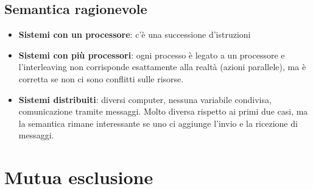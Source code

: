 \documentclass[12pt, a4paper]{report}
\begin{document}
                \subsection{Semantica ragionevole}
                    \begin{itemize}
                        \item \textbf{Sistemi con un processore}: c'è una successione d'istruzioni
                        \item \textbf{Sistemi con più processori}: ogni processo è legato a un processore e l'interleaving non corrisponde esattamente alla realtà (azioni parallele), ma è corretta se non ci sono conflitti sulle risorse.
                        \item \textbf{Sistemi distribuiti}: diversi computer, nessuna variabile condivisa, comunicazione tramite messaggi. Molto diversa rispetto ai primi due casi, ma la semantica rimane interessante se uno ci aggiunge l'invio e la ricezione di messaggi.
                    \end{itemize}
            \section{Mutua esclusione}
\end{document}
